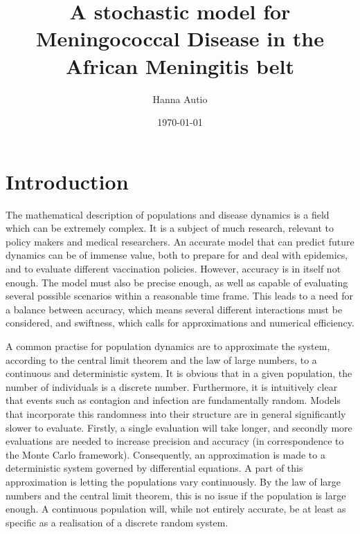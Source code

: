 \documentclass[10pt,a4paper]{article}
\author{Hanna Autio}
\title{A stochastic model for Meningococcal Disease in the African Meningitis belt} %
\date{\today}
\begin{document}
\maketitle
\thispagestyle{empty}
\cleardoublepage
\newpage
\setcounter{page}{1}



\section{Introduction}

The mathematical description of populations and disease dynamics is a field which can be extremely complex. It is a subject of much research, relevant to policy makers and medical researchers. An accurate model that can predict future dynamics can be of immense value, both to prepare for and deal with epidemics, and to evaluate different vaccination policies. However, accuracy is in itself not enough. The model must also be precise enough, as well as capable of evaluating several possible scenarios within a reasonable time frame. This leads to a need for a balance between accuracy, which means several different interactions must be considered, and swiftness, which calls for approximations and numerical efficiency.

A common practise for population dynamics are to approximate the system, according to the central limit theorem and the law of large numbers, to a continuous and deterministic system. It is obvious that in a given population, the number of individuals is a discrete number. Furthermore, it is intuitively clear that events such as contagion and infection are fundamentally random. Models that incorporate this randomness into their structure are in general significantly slower to evaluate. Firstly, a single evaluation will take longer, and secondly more evaluations are needed to increase precision and accuracy (in correspondence to the Monte Carlo framework). Consequently, an approximation is made to a deterministic system governed by differential equations. A part of this approximation is letting the populations vary continuously. By the law of large numbers and the central limit theorem, this is no issue if the population is large enough. A continuous population will, while not entirely accurate, be at least as specific as a realisation of a discrete random system.




\end{document}
